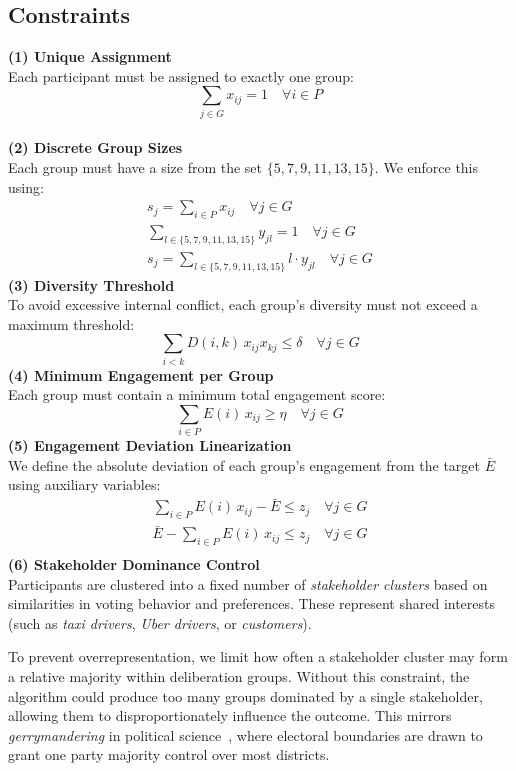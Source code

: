 \subsection*{Constraints}
\textbf{(1) Unique Assignment}\\[3pt]
Each participant must be assigned to exactly one group:
\[
\sum_{j \in G} x_{ij} = 1 \quad \forall i \in P
\]
\\
\textbf{(2) Discrete Group Sizes}\\[3pt]
Each group must have a size from the set \(\{5,7,9,11,13,15\}\).
We enforce this using:
\begin{gather*}
    s_j = \sum_{i \in P} x_{ij} \quad \forall j \in G\\
    \sum_{l \in \{5,7,9,11,13,15\}} y_{jl} = 1 \quad \forall j \in G\\
    s_j = \sum_{l \in \{5,7,9,11,13,15\}} l \cdot y_{jl} \quad \forall j \in G
\end{gather*}
\textbf{(3) Diversity Threshold}\\[3pt]
To avoid excessive internal conflict, each group's diversity must not exceed a maximum threshold:
\[
\sum_{i < k} D(i,k)\,x_{ij} x_{kj} \leq \delta \quad \forall j \in G
\]
\textbf{(4) Minimum Engagement per Group}\\[3pt]
Each group must contain a minimum total engagement score:
\[
\sum_{i \in P} E(i)\,x_{ij} \geq \eta \quad \forall j \in G
\]
\textbf{(5) Engagement Deviation Linearization}\\[3pt]
We define the absolute deviation of each group's engagement from the target \(\bar{E}\) using auxiliary variables:
\begin{gather*}
    \sum_{i \in P} E(i)\,x_{ij} - \bar{E} \leq z_j \quad \forall j \in G\\
    \bar{E} - \sum_{i \in P} E(i)\,x_{ij} \leq z_j \quad \forall j \in G\\
\end{gather*}
\textbf{(6) Stakeholder Dominance Control}\\[3pt]


Participants are clustered into a fixed number of \emph{stakeholder clusters}
based on similarities in voting behavior and preferences.
These represent shared interests (such as \textit{taxi drivers}, \textit{Uber drivers}, or \textit{customers}).

To prevent overrepresentation, we limit how often
a stakeholder cluster may form a relative majority within deliberation groups.
Without this constraint, the algorithm could produce too many groups dominated by a single stakeholder,
allowing them to disproportionately influence the outcome.
This mirrors \emph{gerrymandering} in political science~\parencite{gerrymandering2019},
where electoral boundaries are drawn to grant one party majority control over most districts.



